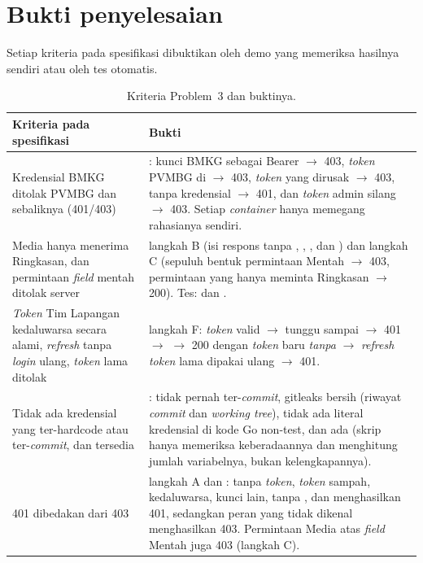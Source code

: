 \section{Bukti penyelesaian}

Setiap kriteria pada spesifikasi dibuktikan oleh demo yang memeriksa hasilnya sendiri atau oleh tes otomatis.

\begin{table}[H]
\centering\small
\begin{tabularx}{\textwidth}{@{}L{4.4cm}Y@{}}
\toprule
\textbf{Kriteria pada spesifikasi} & \textbf{Bukti}\\
\midrule
Kredensial BMKG ditolak PVMBG dan sebaliknya (401/403) & : kunci BMKG sebagai Bearer $\rightarrow$ 403, \emph{token} PVMBG di  $\rightarrow$ 403, \emph{token} yang dirusak $\rightarrow$ 403, tanpa kredensial $\rightarrow$ 401, dan \emph{token} admin silang $\rightarrow$ 403. Setiap \emph{container} hanya memegang rahasianya sendiri.\\
Media hanya menerima Ringkasan, dan permintaan \emph{field} mentah ditolak server &  langkah B (isi respons tanpa , , , dan ) dan langkah C (sepuluh bentuk permintaan Mentah $\rightarrow$ 403, permintaan yang hanya meminta Ringkasan $\rightarrow$ 200). Tes:  dan .\\
\emph{Token} Tim Lapangan kedaluwarsa secara alami, \emph{refresh} tanpa \emph{login} ulang, \emph{token} lama ditolak &  langkah F: \emph{token} valid $\rightarrow$ tunggu sampai  $\rightarrow$ 401 $\rightarrow$  $\rightarrow$ 200 dengan \emph{token} baru \emph{tanpa}  $\rightarrow$ \emph{refresh} \emph{token} lama dipakai ulang $\rightarrow$ 401.\\
Tidak ada kredensial yang ter-hardcode atau ter-\emph{commit}, dan  tersedia & :  tidak pernah ter-\emph{commit}, gitleaks bersih (riwayat \emph{commit} dan \emph{working tree}), tidak ada literal kredensial di kode Go non-test, dan  ada (skrip hanya memeriksa keberadaannya dan menghitung jumlah variabelnya, bukan kelengkapannya).\\
401 dibedakan dari 403 &  langkah A dan : tanpa \emph{token}, \emph{token} sampah, kedaluwarsa, kunci lain, tanpa , dan  menghasilkan 401, sedangkan peran yang tidak dikenal menghasilkan 403. Permintaan Media atas \emph{field} Mentah juga 403 (langkah C).\\
\bottomrule
\end{tabularx}
\caption{Kriteria Problem~3 dan buktinya.}
\end{table}

